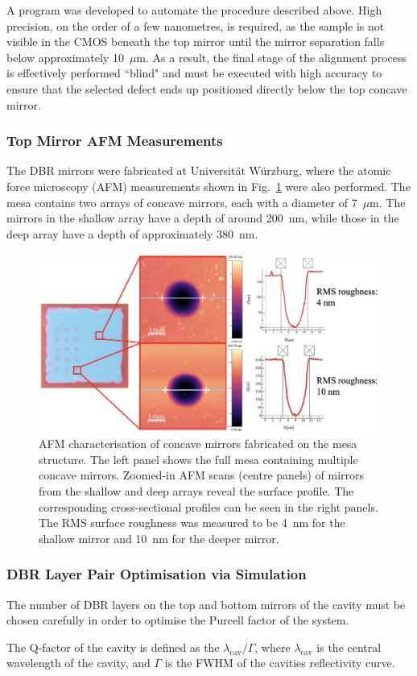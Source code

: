 A program was developed to automate the procedure described above. High precision, on the order of a few nanometres, is required, as the sample is not visible in the CMOS beneath the top mirror until the mirror separation falls below approximately 10~$\mu$m. As a result, the final stage of the alignment process is effectively performed ``blind" and must be executed with high accuracy to ensure that the selected defect ends up positioned directly below the top concave mirror.

\subsubsection{Top Mirror AFM Measurements}

The DBR mirrors were fabricated at Universität Würzburg, where the atomic force microscopy (AFM) measurements shown in Fig.~\ref{fig:AFM-Measurement} were also performed. The mesa contains two arrays of concave mirrors, each with a diameter of 7~$\mu$m. The mirrors in the shallow array have a depth of around 200~nm, while those in the deep array have a depth of approximately 380~nm.

\begin{figure}[h]
    \centering
    \includegraphics[width=0.9\linewidth]{Figures/MirrorAFM.png}
    \caption{AFM characterisation of concave mirrors fabricated on the mesa structure. The left panel shows the full mesa containing multiple concave mirrors. Zoomed-in AFM scans (centre panels) of mirrors from the shallow and deep arrays reveal the surface profile. The corresponding cross-sectional profiles can be seen in the right panels. The RMS surface roughness was measured to be 4~nm for the shallow mirror and 10~nm for the deeper mirror.}
    \label{fig:AFM-Measurement}
\end{figure}


\subsubsection{DBR Layer Pair Optimisation via Simulation}

The number of DBR layers on the top and bottom mirrors of the cavity must be chosen carefully in order to optimise the Purcell factor of the system. 

The Q-factor of the cavity is defined as the $\lambda_{\text{cav}}/\Gamma$, where $\lambda_{\text{cav}}$ is the central wavelength of the cavity, and $\Gamma$ is the FWHM of the cavities reflectivity curve.




\newpage